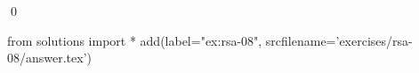 
\begin{ex} 
  \label{ex:rsa-08}
  
  \qed
\end{ex} 
\begin{python0}
from solutions import *
add(label="ex:rsa-08",
    srcfilename='exercises/rsa-08/answer.tex') 
\end{python0}
